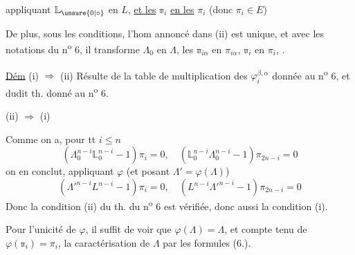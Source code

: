 
appliquant $\mathbb L_{\unsure{0|\circ}}$ en $L$, \uline{et les} $\mathbb{\pi}_i$ \uline{en les} $\pi_i$   (donc $\pi_i\in E$)


De plus, sous les conditions, l'hom annoncé dans (ii) est unique,  et avec les notations du n\textsuperscript{o} 6, il transforme $\mathbb{\Lambda}_0$ en $\Lambda$, les \deleted{\unsure{$\pi_\alpha$}} $\mathbb{\pi}_{i\alpha}$ en $\pi_{i\alpha}$, $\mathbb{\pi}_i$ en $\pi_i$,  .

\uline{Dém} (i) $\Rightarrow$ (ii) Résulte de la table de multiplication des $\varphi_i^{\beta,\alpha}$ donnée au n\textsuperscript{o} 6, et dudit th. donné au n\textsuperscript{o} 6.

(ii) $\Rightarrow$ (i) 

Comme on a, pour tt $i\le n$
\[
 (\Lambda_0^{n-i}\mathbb L_0^{n-i}-1)\pi_i=0,\quad
 (\mathbb L_0^{n-i}\Lambda_0^{n-i}-1)\pi_{2n-i}=0
\]
on en conclut, appliquant $\varphi$ (et posant $\Lambda'=\varphi(\mathbb{\Lambda})$)
\[
 ({\Lambda'}^{n-i}L^{n-i}-1)\pi_i=0,\quad (L^{n-i}{\Lambda'}^{n-i}-1)\pi_{2n-i}=0
\]
Donc la condition (ii) du th. du n\textsuperscript{o} 6 est vérifiée, donc aussi la condition (i).

Pour l'unicité de $\varphi$,   il suffit de voir que $\varphi(\mathbb{\Lambda})=\Lambda$, et   compte tenu de $\varphi(\mathbb{\pi}_i)=\pi_i$,    la caractérisation  de $\Lambda$  par les formules (6.).
